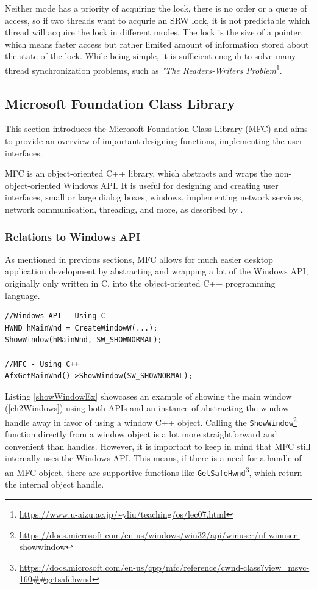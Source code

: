 Neither mode has a priority of acquiring the lock, there is no order or a queue of access, so if two threads want to acqurie an SRW lock, it is not predictable which thread will acquire the lock in different modes. The lock is the size of a pointer, which means faster access but rather limited amount of information stored about the state of the lock. While being simple, it is sufficient enoguh to solve many thread synchronization problems, such as \textit{"The Readers-Writers Problem}\footnote{\url{https://www.u-aizu.ac.jp/~yliu/teaching/os/lec07.html}}.

\subsection{Microsoft Foundation Class Library}
This section introduces the Microsoft Foundation Class Library (MFC) and aims to provide an overview of important designing functions, implementing the user interfaces.

MFC is an object-oriented C++ library, which abstracts and wraps the non-object-oriented Windows API. It is useful for designing and creating user interfaces, small or large dialog boxes, windows, implementing network services, network communication, threading, and more, as described by \cite{MFCDesktop}.

\subsubsection{Relations to Windows API}
As mentioned in previous sections, MFC allows for much easier desktop application development by abstracting and wrapping a lot of the Windows API, originally only written in C, into the object-oriented C++ programming language.

\begin{lstlisting}[caption={Showing a window using Windows API and MFC}, label=showWindowEx]
//Windows API - Using C
HWND hMainWnd = CreateWindowW(...);
ShowWindow(hMainWnd, SW_SHOWNORMAL);

//MFC - Using C++
AfxGetMainWnd()->ShowWindow(SW_SHOWNORMAL);
\end{lstlisting}

Listing \ref{showWindowEx} showcases an example of showing the main window (\ref{ch2Windows}) using both APIs and an instance of abstracting the window handle away in favor of using a window C++ object. Calling the \lstinline{ShowWindow}\footnote{\url{https://docs.microsoft.com/en-us/windows/win32/api/winuser/nf-winuser-showwindow}} function directly from a window object is a lot more straightforward and convenient than handles. However, it is important to keep in mind that MFC still internally uses the Windows API.
This means, if there is a need for a handle of an MFC object, there are supportive functions like \lstinline{GetSafeHwnd}\footnote{\url{https://docs.microsoft.com/en-us/cpp/mfc/reference/cwnd-class?view=msvc-160##getsafehwnd}}, which return the internal object handle.


